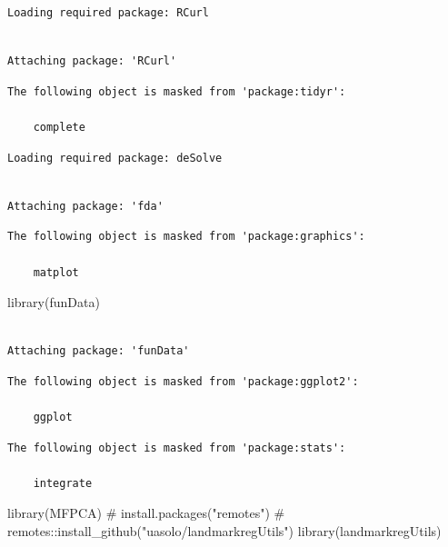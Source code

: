 \documentclass[
]{interact}
\newenvironment{Shaded}{\begin{snugshade}}{\end{snugshade}}
\newcommand{\CommentTok}[1]{\textcolor[rgb]{0.37,0.37,0.37}{#1}}
\newcommand{\FunctionTok}[1]{\textcolor[rgb]{0.28,0.35,0.67}{#1}}
\newcommand{\NormalTok}[1]{\textcolor[rgb]{0.00,0.23,0.31}{#1}}
\begin{document}
\begin{verbatim}
Loading required package: RCurl
\end{verbatim}

\begin{verbatim}

Attaching package: 'RCurl'
\end{verbatim}

\begin{verbatim}
The following object is masked from 'package:tidyr':

    complete
\end{verbatim}

\begin{verbatim}
Loading required package: deSolve
\end{verbatim}

\begin{verbatim}

Attaching package: 'fda'
\end{verbatim}

\begin{verbatim}
The following object is masked from 'package:graphics':

    matplot
\end{verbatim}

\begin{Shaded}
\begin{Highlighting}[]
\FunctionTok{library}\NormalTok{(funData)}
\end{Highlighting}
\end{Shaded}

\begin{verbatim}

Attaching package: 'funData'
\end{verbatim}

\begin{verbatim}
The following object is masked from 'package:ggplot2':

    ggplot
\end{verbatim}

\begin{verbatim}
The following object is masked from 'package:stats':

    integrate
\end{verbatim}

\begin{Shaded}
\begin{Highlighting}[]
\FunctionTok{library}\NormalTok{(MFPCA)}
\CommentTok{\# install.packages("remotes")}
\CommentTok{\# remotes::install\_github("uasolo/landmarkregUtils")}
\FunctionTok{library}\NormalTok{(landmarkregUtils)}
\end{Highlighting}
\end{Shaded}
\end{document}
